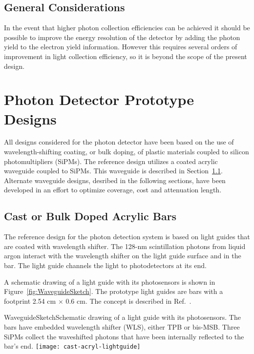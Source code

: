 \subsection{General Considerations}

In the event that higher photon collection efficiencies can be
achieved it should be possible to improve the energy resolution of the
detector by adding the photon yield to the electron yield information.
However this requires several orders of  improvement in light
collection efficiency, so it is beyond the scope of the present design.

\section{Photon Detector Prototype Designs}

All designs considered for the photon detector have been based on the
use of wavelength-shifting coating, or bulk doping, of plastic
materials coupled to silicon photomultipliers (SiPMs). The reference
design utilizes a coated acrylic waveguide coupled to
SiPMs. This waveguide is described in Section~\ref{sec_bars}. Alternate waveguide designs, desribed in the following sections, have
been developed in an effort to optimize coverage, cost and attenuation length. 

\subsection{Cast or Bulk Doped Acrylic Bars}
\label{sec_bars}

The reference design for the photon detection system is based on light
guides that are coated with wavelength shifter. The 128-nm
scintillation photons from liquid argon interact with the wavelength
shifter on the light guide surface and  in
the bar.  The light guide channels the light to photodetectors at its
end.

A schematic drawing of a light guide with its photosensors is shown in
Figure~\ref{fig:WaveguideSketch}. The prototype light guides are bars
with a footprint 2.54 cm $\times$ 0.6 cm.  The concept is described in
Ref.~\cite{bib:MITbars}.

\begin{cdrfigure}{WaveguideSketch}{Schematic drawing of a light guide with its
      photosensors. The bars have embedded wavelength shifter (WLS),
      either TPB or bis-MSB. Three SiPMs collect the waveshifted
      photons that have been internally reflected to the bar's end. }
    \texttt{[image: cast-acryl-lightguide]}
\end{cdrfigure}

